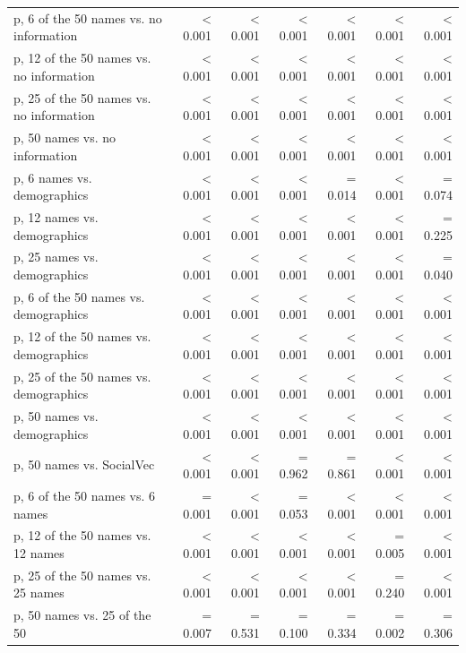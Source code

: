 \begin{tabular}{lrrrrrr}
p, 6 of the 50 names vs. no information & \textless{} 0.001 & \textless{} 0.001 & \textless{} 0.001 & \textless{} 0.001 & \textless{} 0.001 & \textless{} 0.001 \\
p, 12 of the 50 names vs. no information & \textless{} 0.001 & \textless{} 0.001 & \textless{} 0.001 & \textless{} 0.001 & \textless{} 0.001 & \textless{} 0.001 \\
p, 25 of the 50 names vs. no information & \textless{} 0.001 & \textless{} 0.001 & \textless{} 0.001 & \textless{} 0.001 & \textless{} 0.001 & \textless{} 0.001 \\
p, 50 names vs. no information & \textless{} 0.001 & \textless{} 0.001 & \textless{} 0.001 & \textless{} 0.001 & \textless{} 0.001 & \textless{} 0.001 \\
p, 6 names vs. demographics & \textless{} 0.001 & \textless{} 0.001 & \textless{} 0.001 & = 0.014 & \textless{} 0.001 & = 0.074 \\
p, 12 names vs. demographics & \textless{} 0.001 & \textless{} 0.001 & \textless{} 0.001 & \textless{} 0.001 & \textless{} 0.001 & = 0.225 \\
p, 25 names vs. demographics & \textless{} 0.001 & \textless{} 0.001 & \textless{} 0.001 & \textless{} 0.001 & \textless{} 0.001 & = 0.040 \\
p, 6 of the 50 names vs. demographics & \textless{} 0.001 & \textless{} 0.001 & \textless{} 0.001 & \textless{} 0.001 & \textless{} 0.001 & \textless{} 0.001 \\
p, 12 of the 50 names vs. demographics & \textless{} 0.001 & \textless{} 0.001 & \textless{} 0.001 & \textless{} 0.001 & \textless{} 0.001 & \textless{} 0.001 \\
p, 25 of the 50 names vs. demographics & \textless{} 0.001 & \textless{} 0.001 & \textless{} 0.001 & \textless{} 0.001 & \textless{} 0.001 & \textless{} 0.001 \\
p, 50 names vs. demographics & \textless{} 0.001 & \textless{} 0.001 & \textless{} 0.001 & \textless{} 0.001 & \textless{} 0.001 & \textless{} 0.001 \\
p, 50 names vs. SocialVec & \textless{} 0.001 & \textless{} 0.001 & = 0.962 & = 0.861 & \textless{} 0.001 & \textless{} 0.001 \\
p, 6 of the 50 names vs. 6 names & = 0.001 & \textless{} 0.001 & = 0.053 & \textless{} 0.001 & \textless{} 0.001 & \textless{} 0.001 \\
p, 12 of the 50 names vs. 12 names & \textless{} 0.001 & \textless{} 0.001 & \textless{} 0.001 & \textless{} 0.001 & = 0.005 & \textless{} 0.001 \\
p, 25 of the 50 names vs. 25 names & \textless{} 0.001 & \textless{} 0.001 & \textless{} 0.001 & \textless{} 0.001 & = 0.240 & \textless{} 0.001 \\
p, 50 names vs. 25 of the 50 & = 0.007 & = 0.531 & = 0.100 & = 0.334 & = 0.002 & = 0.306 \\
\bottomrule
\end{tabular}

